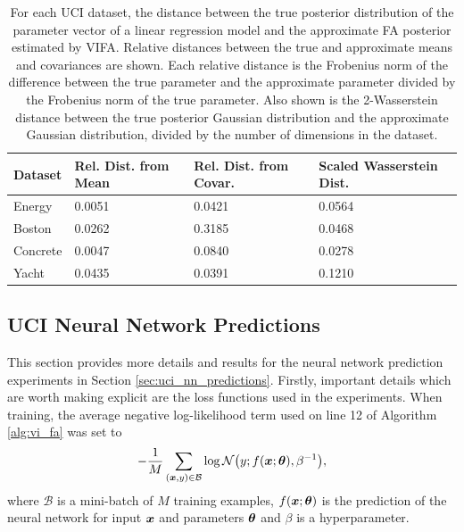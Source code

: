 \documentclass[10pt]{article} %
\begin{document}
\begin{table}[!h]
\caption{For each UCI dataset, the distance between the true posterior distribution
of the parameter vector of a linear regression model and the approximate FA posterior
estimated by VIFA. Relative distances between the true and approximate means and
covariances are shown. Each relative distance is the Frobenius norm of the difference
between the true parameter and the approximate parameter divided by the Frobenius
norm of the true parameter. Also shown is the 2-Wasserstein distance between the true
posterior Gaussian distribution and the approximate Gaussian distribution, divided by
the number of dimensions in the dataset.}
\label{table:linear_regression_vi_posterior_uci}
\begin{center}
\begin{tabular}{l|lll}
\textbf{Dataset} & \textbf{Rel. Dist. from Mean} & \textbf{Rel. Dist. from Covar.} & \textbf{Scaled Wasserstein Dist.} \\ \hline
Energy           & 0.0051                        & 0.0421                          & 0.0564                            \\
Boston           & 0.0262                        & 0.3185                          & 0.0468                            \\
Concrete         & 0.0047                        & 0.0840                          & 0.0278                            \\
Yacht            & 0.0435                        & 0.0391                          & 0.1210                           
\end{tabular}
\end{center}
\end{table}

\subsection{UCI Neural Network Predictions}\label{app:uci_nn_predictions}

This section provides more details and results for the neural network prediction experiments in Section \ref{sec:uci_nn_predictions}. Firstly, important details which are worth making explicit are the loss functions used in the experiments. When training, the average negative log-likelihood term used on line 12 of Algorithm \ref{alg:vi_fa} was set to
\begin{equation}\label{eqn:train_nll}
	-\frac{1}{M} \sum_{({\bm{x}}, y) \in \mathcal{B}} \log \mathcal{N}\big(y; f({\bm{x}}; {\bm{\theta}}), \beta^{-1}\big),
\end{equation}
where $\mathcal{B}$ is a mini-batch of $M$ training examples, $f({\bm{x}}; {\bm{\theta}})$ is the prediction of the neural network for input ${\bm{x}}$ and parameters ${\bm{\theta}}$ and $\beta$ is a hyperparameter. 
\end{document}
